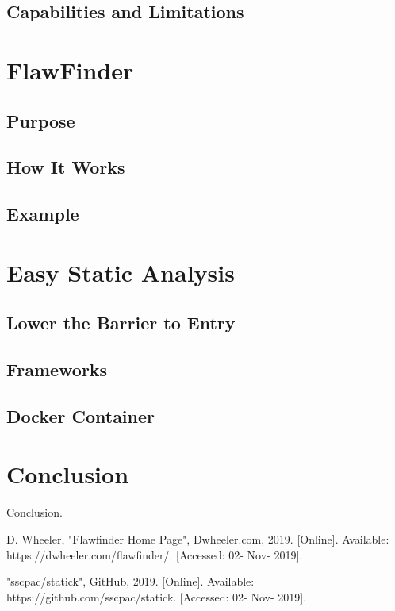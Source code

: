 \documentclass[journal]{IEEEtran}
\begin{document}
\subsection{Capabilities and Limitations}


\section{FlawFinder}

\subsection{Purpose}

\subsection{How It Works}

\subsection{Example}


\section{Easy Static Analysis}

\subsection{Lower the Barrier to Entry}

\subsection{Frameworks}

\subsection{Docker Container}


\section{Conclusion}
Conclusion.



\begin{thebibliography}{00}

 D. Wheeler, "Flawfinder Home Page", Dwheeler.com, 2019. [Online]. Available:
https://dwheeler.com/flawfinder/. [Accessed: 02- Nov- 2019].

 "sscpac/statick", GitHub, 2019. [Online]. Available:
https://github.com/sscpac/statick. [Accessed: 02- Nov- 2019].

\end{thebibliography}
\end{document}
